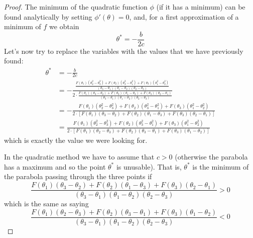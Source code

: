 \begin{proof}
    The minimum of the quadratic function \(\phi\) (if it has a minimum) can be found analytically by setting \(\phi'(\theta) = 0\), and, for a first approximation of a minimum of \(f\) we obtain
    \[\theta^* = -\frac{b}{2c}\]
    Let's now try to replace the variables with the values that we have previously found:
    \begin{equation*}
        \begin{split}
            \theta^* &= -\frac{b}{2c} \\
            &= -\frac{\frac{F(\theta_1)(\theta_2^2 - \theta_3^2) + F(\theta_2)(\theta_3^2 - \theta_1^2) + F(\theta_3)(\theta_1^2 - \theta_2^2)}{(\theta_3 - \theta_1)(\theta_1 - \theta_2)(\theta_2 - \theta_3)}}{2\cdot\frac{F(\theta_1)(\theta_3 - \theta_2) + F(\theta_2)(\theta_1 - \theta_3) + F(\theta_3)(\theta_2 - \theta_1)}{(\theta_3 - \theta_1)(\theta_1 - \theta_2)(\theta_2 - \theta_3)}} \\
            &= -\frac{F(\theta_1)(\theta_2^2 - \theta_3^2) + F(\theta_2)(\theta_3^2 - \theta_1^2) + F(\theta_3)(\theta_1^2 - \theta_2^2)}{2\cdot [F(\theta_1)(\theta_3 - \theta_2) + F(\theta_2)(\theta_1 - \theta_3) + F(\theta_3)(\theta_2 - \theta_1)]} \\
            &= \frac{F(\theta_1)(\theta_2^2 - \theta_3^2) + F(\theta_2)(\theta_3^2 - \theta_1^2) + F(\theta_3)(\theta_1^2 - \theta_2^2)}{2\cdot [F(\theta_1)(\theta_2 - \theta_3) + F(\theta_2)(\theta_3 - \theta_1) + F(\theta_3)(\theta_1 - \theta_2)]}
        \end{split}
    \end{equation*}
    which is exactly the value we were looking for.\par
    In the quadratic method we have to assume that \(c>0\) (otherwise the parabola has a maximum and so the point \(\theta^*\) is unusable). That is, \(\theta^*\) is the minimum of the parabola passing through the three points if
    \[\frac{F(\theta_1)(\theta_3 - \theta_2) + F(\theta_2)(\theta_1 - \theta_3) + F(\theta_3)(\theta_2 - \theta_1)}{(\theta_3 - \theta_1)(\theta_1 - \theta_2)(\theta_2 - \theta_3)} > 0\]
    which is the same as saying
    \[\frac{F(\theta_1)(\theta_2 - \theta_3) + F(\theta_2)(\theta_3 - \theta_1) + F(\theta_3)(\theta_1 - \theta_2)}{(\theta_3 - \theta_1)(\theta_1 - \theta_2)(\theta_2 - \theta_3)} < 0\]
\end{proof}